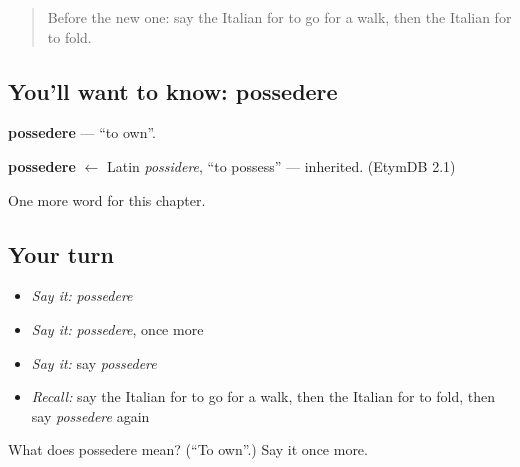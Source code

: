 \label{lesson:IT-C180-possedere}



\begin{quote}
Before the new one: say the Italian for to go for a walk, then the Italian for to fold.
\end{quote}

\subsection*{You'll want to know: possedere}
\textbf{possedere} — \textquotedblleft{}to own\textquotedblright{}.

\begin{cousinweb}
\textbf{possedere} $\leftarrow$ Latin \emph{possidere}, \textquotedblleft{}to possess\textquotedblright{} — inherited. (EtymDB 2.1)
\end{cousinweb}

\begin{grammarlens}[title={What you've built}]
One more word for this chapter.
\end{grammarlens}

\subsection*{Your turn}
\begin{itemize}
\raggedright
  \item \emph{Say it:} \emph{possedere}
  \item \emph{Say it:} \emph{possedere}, once more
  \item \emph{Say it:} say \emph{possedere}
  \item \emph{Recall:} say the Italian for to go for a walk, then the Italian for to fold, then say \emph{possedere} again
\end{itemize}

\begin{tcolorbox}[breakable,colback=teal!4,colframe=teal!35!black,title={Before you move on}]
What does possedere mean? (\textquotedblleft{}To own\textquotedblright{}.) Say it once more.
\end{tcolorbox}
